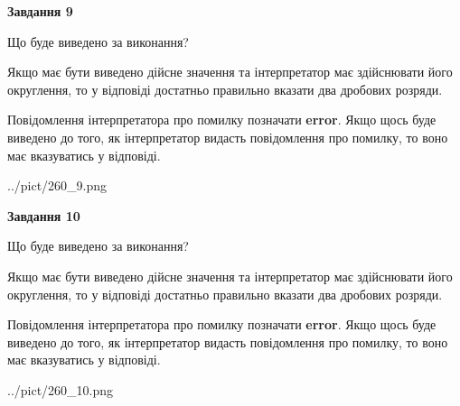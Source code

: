 \documentclass[12pt, ukrainian]{article}
\begin{document}
{\begin {Large}
{\begin {center}\textbf{Завдання 9}\end {center}}\par
Що буде виведено за виконання? \par

Якщо має бути виведено дійсне значення та інтерпретатор має здійснювати його округлення, 
то у відповіді достатньо правильно вказати два дробових розряди.

Повідомлення інтерпретатора про помилку позначати \textbf{error}.
Якщо щось буде виведено до того, як інтерпретатор видасть повідомлення про помилку, 
то воно має вказуватись у відповіді. \par

\begin{center}
	{../pict/260_9.png}
\end{center}
\newpage

{\begin {center}\textbf{Завдання 10}\end {center}}\par
Що буде виведено за виконання? \par

Якщо має бути виведено дійсне значення та інтерпретатор має здійснювати його округлення, 
то у відповіді достатньо правильно вказати два дробових розряди.

Повідомлення інтерпретатора про помилку позначати \textbf{error}.
Якщо щось буде виведено до того, як інтерпретатор видасть повідомлення про помилку, 
то воно має вказуватись у відповіді. \par

\begin{center}
	{../pict/260_10.png}
\end{center}
\newpage

\end {Large}}
\end{document}
